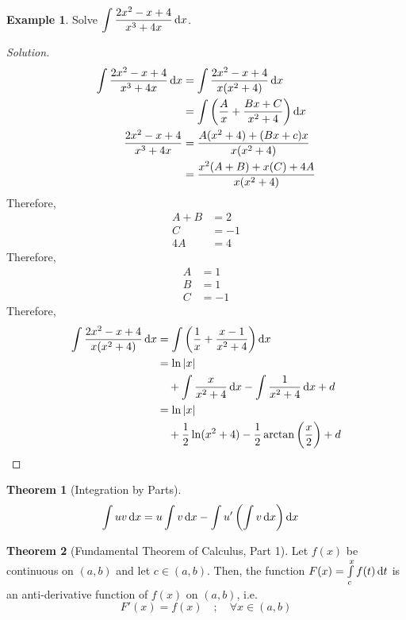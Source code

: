 \documentclass[fleqn, a4paper, 10pt]{article}
\theoremstyle{definition}
\newtheorem{example}{Example}
\theoremstyle{theorem}
\newtheorem{theorem}{Theorem}
\theoremstyle{remark}
\newenvironment{solution}
	{\begin{proof}[Solution]\let\qed\relax}
	{\end{proof}}
\begin{document}
\begin{multicols}{2}
\begin{example}
	Solve $\displaystyle \int \dfrac{2x^2 - x + 4}{x^3 + 4x} \dif x$.
\end{example}

\begin{solution}
	\begin{align*}
		\int \dfrac{2x^2 - x + 4}{x^3 + 4x} \dif x &= \int \dfrac{2x^2 - x + 4}{x(x^2 + 4)} \dif x\\
		&= \int \left(\dfrac{A}{x} + \dfrac{Bx + C}{x^2 + 4}\right) \dif x\\
		\dfrac{2x^2 - x + 4}{x^3 + 4x} &= \dfrac{A(x^2 + 4) + (Bx + c)x}{x(x^2 + 4)}\\
		&= \dfrac{x^2(A + B) + x(C) + 4A}{x(x^2 + 4)}
	\end{align*}
	Therefore,
	\begin{align*}
		A + B &= 2\\
		C &= -1\\
		4A &= 4
	\end{align*}
	Therefore, 
	\begin{align*}
		A &= 1\\
		B &= 1\\
		C &= -1
	\end{align*}
	Therefore,
	\begin{align*}
		\int \dfrac{2x^2 - x + 4}{x(x^2 + 4)} \dif x &= \int \left(\dfrac{1}{x} + \dfrac{x - 1}{x^2 + 4}\right) \dif x\\
		&= \ln |x| \\
		&\quad+ \int \dfrac{x}{x^2 + 4} \dif x - \int \dfrac{1}{x^2 + 4} \dif x + d\\
		&= \ln |x|\\
		&\quad+ \dfrac{1}{2} \ln (x^2 + 4) - \dfrac{1}{2}\arctan\left(\dfrac{x}{2}\right) + d
	\end{align*}
\end{solution}

\begin{theorem}[Integration by Parts]
	\begin{align*}
		\int u v \dif x &= u \int v \dif x - \int u' \left(\int v \dif x\right) \dif x
	\end{align*}
\end{theorem}

\begin{theorem}[Fundamental Theorem of Calculus, Part 1]\label{Fundamental Theorem of Calculus, Part 1}
	Let $f(x)$ be continuous on $(a, b)$ and let $c \in (a, b)$. Then, the function $F(x) = \int\limits_{c}^{x} f(t) \dif t$ is an anti-derivative function of $f(x)$ on $(a, b)$, i.e.
	\begin{equation*}
	F'(x) = f(x) \quad ; \quad \forall x \in (a, b)
	\end{equation*}
\end{theorem}


\end{multicols}
\end{document}
